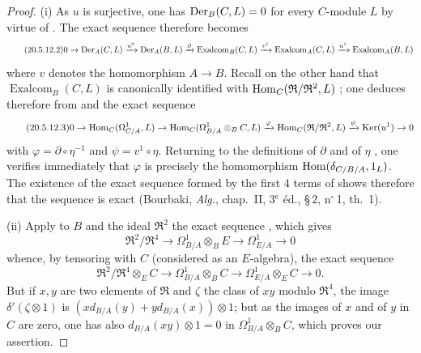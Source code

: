 \begin{proof}
(i) As $u$ is surjective, one has $\operatorname{Der}_B(C,L)=0$ for every $C$-module $L$ by virtue of . The exact sequence  therefore becomes
\begin{equation}
\tag{20.5.12.2}
  \label{0.20.5.12.2}
  0\to\operatorname{Der}_A(C,L)\xrightarrow{u^0}\operatorname{Der}_A(B,L)\xrightarrow{\partial}\operatorname{Exalcom}_B(C,L)
  \xrightarrow{v^1}\operatorname{Exalcom}_A(C,L)\xrightarrow{u^1}\operatorname{Exalcom}_A(B,L)
\end{equation}
where $v$ denotes the homomorphism $A\to B$.
Recall on the other hand that $\operatorname{Exalcom}_B(C,L)$ is canonically identified with $\operatorname{Hom}_C(\mathfrak{R}/\mathfrak{R}^2,L)$ ; one deduces therefore from  and  the exact sequence
\begin{equation}
\tag{20.5.12.3}
  \label{0.20.5.12.3}
  0\to\operatorname{Hom}_C(\Omega^1_{C/A},L)\to\operatorname{Hom}_C(\Omega^1_{B/A}\otimes_B C,L)\xrightarrow{\varphi}\operatorname{Hom}_C(\mathfrak{R}/\mathfrak{R}^2,L)\xrightarrow{\psi}\operatorname{Ker}(u^1)\to 0
\end{equation}
with $\varphi=\partial\circ\eta^{-1}$ and $\psi=v^1\circ\eta$.
Returning to the definitions of $\partial$  and of $\eta$ , one verifies immediately that $\varphi$ is precisely the homomorphism $\operatorname{Hom}(\delta_{C/B/A},1_L)$.
The existence of the exact sequence formed by the first 4 terms of  shows therefore that the sequence  is exact (Bourbaki, \emph{Alg.}, chap.~II, 3$^\text{e}$ \'{e}d., \S\,2, n$^\circ$\,1, th.~1).

\medskip
(ii) Apply to $B$ and the ideal $\mathfrak{R}^2$ the exact sequence , which gives
\begin{equation}
\tag{20.5.12.4}
  \label{0.20.5.12.4}
  \mathfrak{R}^2/\mathfrak{R}^4\to\Omega^1_{B/A}\otimes_B E\to\Omega^1_{E/A}\to 0
\end{equation}
whence, by tensoring with $C$ (considered as an $E$-algebra), the exact sequence
\[
  \mathfrak{R}^2/\mathfrak{R}^4\otimes_E C\to\Omega^1_{B/A}\otimes_B C\to\Omega^1_{E/A}\otimes_E C\to 0.
\]
But if $x,y$ are two elements of $\mathfrak{R}$ and $\zeta$ the class of $xy$ modulo $\mathfrak{R}^4$, the image $\delta'(\zeta\otimes 1)$ is $(xd_{B/A}(y)+yd_{B/A}(x))\otimes 1$; but as the images of $x$ and of $y$ in $C$ are zero, one has also $d_{B/A}(xy)\otimes 1=0$ in $\Omega^1_{B/A}\otimes_B C$, which proves our assertion.


\end{proof}
